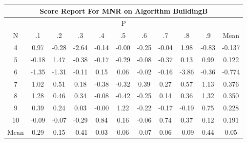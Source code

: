 \documentclass[11pt,a4paper]{report}
\begin{document}
\begin{longtable}{ | c || c | c | c | c | c | c | c | c | c || c |}
\hline
\multicolumn{11}{|c|}{ Score Report For MNR on Algorithm BuildingB} \\
\hline
\multicolumn{11}{|c|}{ P } \\
\hline
N & .1 & .2 & .3 & .4 & .5 & .6 & .7 & .8 & .9 & Mean\\
 \hline
 \hline
 \endhead
  4 &  \cellcolor[HTML]{E7E7FF} 0.97 &  \cellcolor[HTML]{FFF7F7} -0.28 &  \cellcolor[HTML]{FFBFBF} -2.64 &  \cellcolor[HTML]{FFFFFF} -0.14 &  \cellcolor[HTML]{FFFFFF} -0.00 &  \cellcolor[HTML]{FFF7F7} -0.25 &  \cellcolor[HTML]{FFFFFF} -0.04 &  \cellcolor[HTML]{CFCFFF} 1.98 &  \cellcolor[HTML]{FFE7E7} -0.83 & -0.137 \\
  5 &  \cellcolor[HTML]{FFF7F7} -0.18 &  \cellcolor[HTML]{D7D7FF} 1.47 &  \cellcolor[HTML]{FFF7F7} -0.38 &  \cellcolor[HTML]{FFF7F7} -0.17 &  \cellcolor[HTML]{FFF7F7} -0.29 &  \cellcolor[HTML]{FFFFFF} -0.08 &  \cellcolor[HTML]{FFF7F7} -0.37 &  \cellcolor[HTML]{FFFFFF} 0.13 &  \cellcolor[HTML]{E7E7FF} 0.99 & 0.122 \\
  6 &  \cellcolor[HTML]{FFDFDF} -1.35 &  \cellcolor[HTML]{FFDFDF} -1.31 &  \cellcolor[HTML]{FFFFFF} -0.11 &  \cellcolor[HTML]{FFFFFF} 0.15 &  \cellcolor[HTML]{FFFFFF} 0.06 &  \cellcolor[HTML]{FFFFFF} -0.02 &  \cellcolor[HTML]{FFFFFF} -0.16 &  \cellcolor[HTML]{FF9F9F} -3.86 &  \cellcolor[HTML]{FFF7F7} -0.36 & -0.774 \\
  7 &  \cellcolor[HTML]{E7E7FF} 1.02 &  \cellcolor[HTML]{EFEFFF} 0.51 &  \cellcolor[HTML]{F7F7FF} 0.18 &  \cellcolor[HTML]{FFF7F7} -0.38 &  \cellcolor[HTML]{FFF7F7} -0.32 &  \cellcolor[HTML]{F7F7FF} 0.39 &  \cellcolor[HTML]{F7F7FF} 0.27 &  \cellcolor[HTML]{EFEFFF} 0.57 &  \cellcolor[HTML]{DFDFFF} 1.13 & 0.376 \\
  8 &  \cellcolor[HTML]{DFDFFF} 1.28 &  \cellcolor[HTML]{F7F7FF} 0.46 &  \cellcolor[HTML]{F7F7FF} 0.34 &  \cellcolor[HTML]{FFFFFF} -0.08 &  \cellcolor[HTML]{FFF7F7} -0.42 &  \cellcolor[HTML]{FFF7F7} -0.25 &  \cellcolor[HTML]{FFFFFF} 0.14 &  \cellcolor[HTML]{F7F7FF} 0.36 &  \cellcolor[HTML]{DFDFFF} 1.32 & 0.350 \\
  9 &  \cellcolor[HTML]{F7F7FF} 0.39 &  \cellcolor[HTML]{F7F7FF} 0.24 &  \cellcolor[HTML]{FFFFFF} 0.03 &  \cellcolor[HTML]{FFFFFF} -0.00 &  \cellcolor[HTML]{DFDFFF} 1.22 &  \cellcolor[HTML]{FFF7F7} -0.22 &  \cellcolor[HTML]{FFF7F7} -0.17 &  \cellcolor[HTML]{FFF7F7} -0.19 &  \cellcolor[HTML]{EFEFFF} 0.75 & 0.228 \\
  10 &  \cellcolor[HTML]{FFFFFF} -0.09 &  \cellcolor[HTML]{FFFFFF} -0.07 &  \cellcolor[HTML]{FFF7F7} -0.29 &  \cellcolor[HTML]{E7E7FF} 0.84 &  \cellcolor[HTML]{F7F7FF} 0.16 &  \cellcolor[HTML]{FFFFFF} -0.06 &  \cellcolor[HTML]{EFEFFF} 0.74 &  \cellcolor[HTML]{F7F7FF} 0.37 &  \cellcolor[HTML]{FFFFFF} 0.12 & 0.191 \\
 \hline
 \hline
Mean &  \cellcolor[HTML]{F7F7FF} 0.29 &  \cellcolor[HTML]{FFFFFF} 0.15 &  \cellcolor[HTML]{FFF7F7} -0.41 &  \cellcolor[HTML]{FFFFFF} 0.03 &  \cellcolor[HTML]{FFFFFF} 0.06 &  \cellcolor[HTML]{FFFFFF} -0.07 &  \cellcolor[HTML]{FFFFFF} 0.06 &  \cellcolor[HTML]{FFFFFF} -0.09 &  \cellcolor[HTML]{F7F7FF} 0.44 &  \cellcolor[HTML]{FFFFFF} 0.05
\end{longtable}
\end{document}
